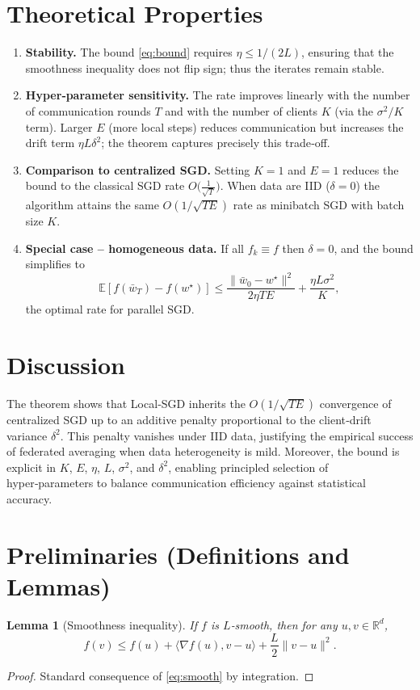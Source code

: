 \documentclass{article}
\newtheorem{lemma}{Lemma}
\newcommand{\E}{\mathbb{E}}
\newcommand{\R}{\mathbb{R}}
\begin{document}
\section*{Theoretical Properties}
\begin{enumerate}[label={\arabic*.},leftmargin=*]
\item \textbf{Stability.} The bound \eqref{eq:bound} requires $\eta\le1/(2L)$,
ensuring that the smoothness inequality does not flip sign; thus the iterates remain stable.

\item \textbf{Hyper‑parameter sensitivity.} The rate improves linearly with the number of
communication rounds $T$ and with the number of clients $K$ (via the $\sigma^2/K$ term). Larger $E$ (more local steps) reduces communication but increases the drift term $\eta L\delta^2$; the theorem captures precisely this trade‑off.

\item \textbf{Comparison to centralized SGD.} Setting $K=1$ and $E=1$ reduces the bound to the classical SGD rate $O\big(\frac{1}{\sqrt{T}}\big)$. When data are IID ($\delta=0$) the algorithm attains the same $O(1/\sqrt{TE})$ rate as minibatch SGD with batch size $K$.

\item \textbf{Special case – homogeneous data.} If all $f_k\equiv f$ then $\delta=0$, and the bound simplifies to
\[
\E[f(\bar w_T)-f(w^\star)]\le\frac{\|\bar w_0-w^\star\|^2}{2\eta TE}
+\frac{\eta L\sigma^2}{K},
\]
the optimal rate for parallel SGD.
\end{enumerate}

\section*{Discussion}
The theorem shows that Local‑SGD inherits the $O(1/\sqrt{TE})$ convergence of centralized SGD up to an additive penalty proportional to the client‑drift variance $\delta^2$. This penalty vanishes under IID data, justifying the empirical success of federated averaging when data heterogeneity is mild. Moreover, the bound is explicit in $K$, $E$, $\eta$, $L$, $\sigma^2$, and $\delta^2$, enabling principled selection of hyper‑parameters to balance communication efficiency against statistical accuracy.

\section*{Preliminaries (Definitions and Lemmas)}
\begin{lemma}[Smoothness inequality]\label{lem:smooth}
If $f$ is $L$‑smooth, then for any $u,v\in\R^d$,
\[
f(v)\le f(u)+\langle\nabla f(u),v-u\rangle+\frac{L}{2}\|v-u\|^2.
\]
\end{lemma}
\begin{proof}
Standard consequence of \eqref{eq:smooth} by integration. \qedhere
\end{proof}
\end{document}
